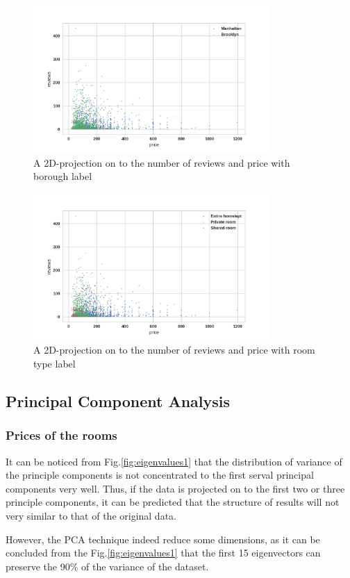 \documentclass[12pt]{article}
\begin{document}
\begin{figure}[htb]
\centering
\includegraphics[width = 0.8\textwidth]{images/pair-reviews-price1.png}
\caption{A 2D-projection on to the number of reviews and price with borough label}
\label{fig:pair-reviews-price1}
\end{figure}
\begin{figure}[htb]
\centering
\includegraphics[width = 0.8\textwidth]{images/pair-reviews-price2.png}
\caption{A 2D-projection on to the number of reviews and price with room type label}
\label{fig:pair-reviews-price2}
\end{figure}
\subsection{Principal Component Analysis}
\subsubsection{Prices of the rooms}

It can be noticed from Fig.\ref{fig:eigenvalues1} that the distribution of variance of the principle components is not concentrated to the first serval principal components very well. Thus, if the data is projected on to the first two or three principle components, it can be predicted that the structure of results will not very similar to that of the original data.\par
However, the PCA technique indeed reduce some dimensions, as it can be concluded from the Fig.\ref{fig:eigenvalues1} that the first 15 eigenvectors can preserve the 90\% of the variance of the dataset. 
\end{document}
